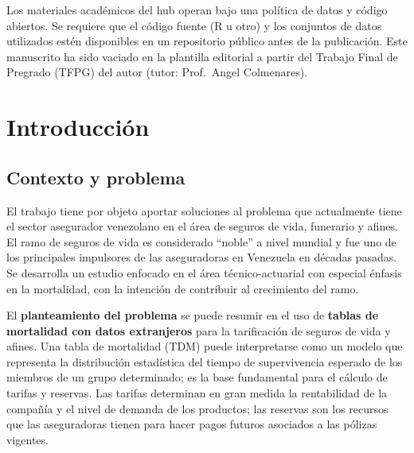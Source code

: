\documentclass[
  11pt,
  a4paper,
]{article}
\begin{document}
\begin{tcolorbox}[enhanced jigsaw, rightrule=.15mm, coltitle=black, bottomtitle=1mm, left=2mm, toprule=.15mm, opacitybacktitle=0.6, opacityback=0, titlerule=0mm, bottomrule=.15mm, colframe=quarto-callout-note-color-frame, colbacktitle=quarto-callout-note-color!10!white, toptitle=1mm, arc=.35mm, title={Reproducibilidad}, breakable, leftrule=.75mm, colback=white]

Los materiales académicos del hub operan bajo una política de datos y
código abiertos. Se requiere que el código fuente (R u otro) y los
conjuntos de datos utilizados estén disponibles en un repositorio
público antes de la publicación. Este manuscrito ha sido vaciado en la
plantilla editorial a partir del Trabajo Final de Pregrado (TFPG) del
autor (tutor: Prof.~Angel Colmenares).

\end{tcolorbox}

\section{Introducción}\label{introducciuxf3n}

\subsection{Contexto y problema}\label{contexto-y-problema}

El trabajo tiene por objeto aportar soluciones al problema que
actualmente tiene el sector asegurador venezolano en el área de seguros
de vida, funerario y afines. El ramo de seguros de vida es considerado
``noble'' a nivel mundial y fue uno de los principales impulsores de las
aseguradoras en Venezuela en décadas pasadas. Se desarrolla un estudio
enfocado en el área técnico-actuarial con especial énfasis en la
mortalidad, con la intención de contribuir al crecimiento del ramo.

El \textbf{planteamiento del problema} se puede resumir en el uso de
\textbf{tablas de mortalidad con datos extranjeros} para la tarificación
de seguros de vida y afines. Una tabla de mortalidad (TDM) puede
interpretarse como un modelo que representa la distribución estadística
del tiempo de supervivencia esperado de los miembros de un grupo
determinado; es la base fundamental para el cálculo de tarifas y
reservas. Las tarifas determinan en gran medida la rentabilidad de la
compañía y el nivel de demanda de los productos; las reservas son los
recursos que las aseguradoras tienen para hacer pagos futuros asociados
a las pólizas vigentes.
\end{document}
